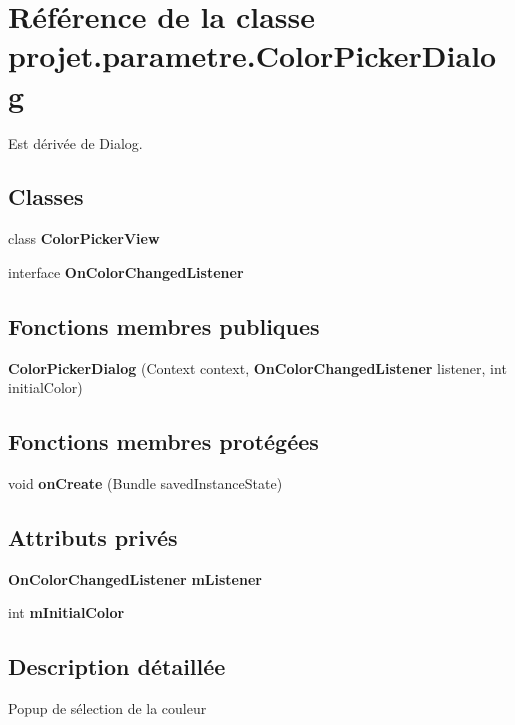 \section{\-Référence de la classe projet.\-parametre.\-Color\-Picker\-Dialog}
\label{classprojet_1_1parametre_1_1_color_picker_dialog}


\-Est dérivée de \-Dialog.

\subsection*{\-Classes}
\begin{DoxyCompactItemize}
\item 
class {\bf \-Color\-Picker\-View}
\item 
interface {\bf \-On\-Color\-Changed\-Listener}
\end{DoxyCompactItemize}
\subsection*{\-Fonctions membres publiques}
\begin{DoxyCompactItemize}
\item 
{\bf \-Color\-Picker\-Dialog} (\-Context context, {\bf \-On\-Color\-Changed\-Listener} listener, int initial\-Color)
\end{DoxyCompactItemize}
\subsection*{\-Fonctions membres protégées}
\begin{DoxyCompactItemize}
\item 
void {\bf on\-Create} (\-Bundle saved\-Instance\-State)
\end{DoxyCompactItemize}
\subsection*{\-Attributs privés}
\begin{DoxyCompactItemize}
\item 
{\bf \-On\-Color\-Changed\-Listener} {\bf m\-Listener}
\item 
int {\bf m\-Initial\-Color}
\end{DoxyCompactItemize}


\subsection{\-Description détaillée}
\-Popup de sélection de la couleur

